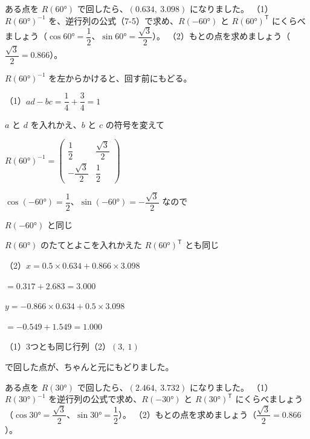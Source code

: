 \begin{reidai}[回す前にもどす]
ある点を $R(60°)$ で回したら、$(0.634,\ 3.098)$ になりました。\newline
（1）\nobreak $R(60°)^{-1}$ を、逆行列の公式（7-5）で求め、$R(-60°)$ と $R(60°)^{\mathsf T}$ にくらべましょう（$\cos60°=\dfrac12$、$\sin60°=\dfrac{\sqrt3}{2}$）。\newline
（2）\nobreak もとの点を求めましょう（$\dfrac{\sqrt3}{2}=0.866$）。\par
\kangaekata $R(60°)^{-1}$ を左からかけると、回す前にもどる。\par
\shiki （1）\nobreak $ad-bc=\dfrac14+\dfrac34=1$\par
\kviigq \phantom{（1）}$a$ と $d$ を入れかえ、$b$ と $c$ の符号を変えて\par
\kviigq \phantom{（1）}$R(60°)^{-1}=\begin{pmatrix}\dfrac12&\dfrac{\sqrt3}{2}\\[6pt]-\dfrac{\sqrt3}{2}&\dfrac12\end{pmatrix}$\par
\kviigq \phantom{（1）}$\cos(-60°)=\dfrac12$、$\sin(-60°)=-\dfrac{\sqrt3}{2}$ なので\par
\kviigq \phantom{（1）}$R(-60°)$ と同じ\par
\kviigq \phantom{（1）}$R(60°)$ のたてとよこを入れかえた $R(60°)^{\mathsf T}$ とも同じ\par
\kviigq （2）\nobreak $x=0.5\times0.634+0.866\times3.098$\par
\kviigq \phantom{（2）$x$}${}=0.317+2.683=3.000$\par
\kviigq \phantom{（2）}$y=-0.866\times0.634+0.5\times3.098$\par
\kviigq \phantom{（2）$x$}${}=-0.549+1.549=1.000$\par
\kotae （1）\nobreak 3つとも同じ行列\quad（2）\nobreak $(3,\ 1)$
\end{reidai}
で回した点が、ちゃんと元にもどりました。

\begin{jibun}
ある点を $R(30°)$ で回したら、$(2.464,\ 3.732)$ になりました。\newline
（1）\nobreak $R(30°)^{-1}$ を逆行列の公式で求め、$R(-30°)$ と $R(30°)^{\mathsf T}$ にくらべましょう（$\cos30°=\dfrac{\sqrt3}{2}$、$\sin30°=\dfrac12$）。\newline
（2）\nobreak もとの点を求めましょう（$\dfrac{\sqrt3}{2}=0.866$）。
\end{jibun}


